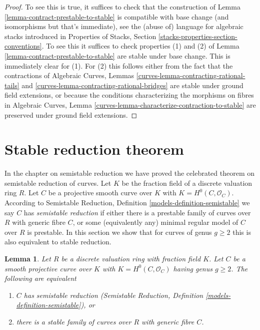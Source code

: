 \documentclass{stacks-project}
\theoremstyle{plain}
\newtheorem{lemma}[subsection]{Lemma}
\theoremstyle{definition}
\theoremstyle{remark}
\numberwithin{equation}{subsection}
\begin{document}
\begin{proof}
To see this is true, it suffices to check that the construction of
Lemma \ref{lemma-contract-prestable-to-stable}
is compatible with base change (and isomorphisms but that's immediate),
see the (abuse of) language for algebraic stacks introduced
in Properties of Stacks, Section \ref{stacks-properties-section-conventions}.
To see this it suffices to check properties (1) and (2) of
Lemma \ref{lemma-contract-prestable-to-stable} are stable
under base change. This is immediately clear for (1).
For (2) this follows either from the fact that the contractions of
Algebraic Curves, Lemmas \ref{curves-lemma-contracting-rational-tails} and
\ref{curves-lemma-contracting-rational-bridges}
are stable under ground field extensions, or
because the conditions characterizing the morphisms on fibres in
Algebraic Curves, Lemma \ref{curves-lemma-characterize-contraction-to-stable}
are preserved under ground field extensions.
\end{proof}





\section{Stable reduction theorem}
\label{section-stable-reduction}

\noindent
In the chapter on semistable reduction we have proved the celebrated
theorem on semistable reduction of curves. Let $K$ be the fraction
field of a discrete valuation ring $R$. Let $C$ be a projective smooth
curve over $K$ with $K = H^0(C, \mathcal{O}_C)$. According to
Semistable Reduction, Definition \ref{models-definition-semistable}
we say $C$ has {\it semistable reduction} if either
there is a prestable family of curves over $R$ with generic fibre $C$, or
some (equivalently any) minimal regular model of $C$ over $R$ is prestable.
In this section we show that for curves of genus $g \geq 2$
this is also equivalent to stable reduction.

\begin{lemma}
\label{lemma-stable-reduction}
Let $R$ be a discrete valuation ring with fraction field $K$.
Let $C$ be a smooth projective curve over $K$ with
$K = H^0(C, \mathcal{O}_C)$ having genus $g \geq 2$.
The following are equivalent
\begin{enumerate}
\item $C$ has semistable reduction
(Semistable Reduction, Definition \ref{models-definition-semistable}), or
\item there is a stable family of curves over $R$ with generic fibre $C$.
\end{enumerate}
\end{lemma}
\end{document}
